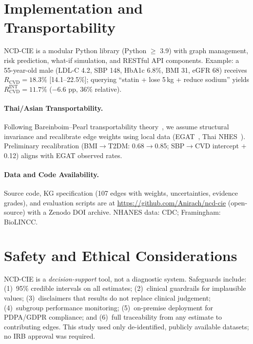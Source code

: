 \documentclass[runningheads]{llncs}
\begin{document}
\section{Implementation and Transportability}\label{sec:impl}

NCD-CIE is a modular Python library (Python $\geq$ 3.9) with
graph management, risk prediction, what-if simulation, and RESTful
API components.
Example: a 55-year-old male (LDL-C 4.2, SBP 148, HbA1c 6.8\%, BMI
31, eGFR 68) receives $R_{\text{CVD}} = 18.3\%$ [14.1--22.5\%];
querying ``statin + lose 5\,kg + reduce sodium'' yields
$R_{\text{CVD}}^{\text{INT}} = 11.7\%$ ($-$6.6 pp, 36\% relative).

\paragraph{Thai/Asian Transportability.}
Following Bareinboim--Pearl transportability
theory~\cite{bareinboim2016causal}, we assume structural invariance
and recalibrate edge weights using local data
(EGAT~\cite{sritara2003egat}, Thai NHES~\cite{aekplakorn2011thai}).
Preliminary recalibration (BMI$\to$T2DM: 0.68$\to$0.85;
SBP$\to$CVD intercept $+$0.12) aligns with EGAT observed rates.

\paragraph{Data and Code Availability.}
Source code, KG specification (107 edges with weights, uncertainties,
evidence grades), and evaluation scripts are at
\url{https://github.com/Anirach/ncd-cie} (open-source) with a
Zenodo DOI archive.
NHANES data: CDC; Framingham: BioLINCC.

\section{Safety and Ethical Considerations}\label{sec:ethics}

NCD-CIE is a \emph{decision-support} tool, not a diagnostic system.
Safeguards include: (1)~95\% credible intervals on all estimates;
(2)~clinical guardrails for implausible values;
(3)~disclaimers that results do not replace clinical judgement;
(4)~subgroup performance monitoring;
(5)~on-premise deployment for PDPA/GDPR compliance; and
(6)~full traceability from any estimate to contributing edges.
This study used only de-identified, publicly available datasets;
no IRB approval was required.
\end{document}
